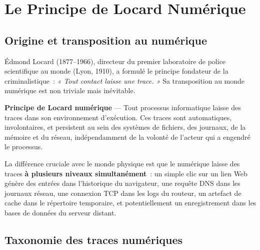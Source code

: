 \section{Le Principe de Locard Numérique}
\label{sec:locard}

\subsection{Origine et transposition au numérique}

Édmond Locard (1877--1966), directeur du premier laboratoire de police
scientifique au monde (Lyon, 1910), a formulé le principe fondateur de la
criminalistique~: \textit{« Tout contact laisse une trace. »} Sa transposition
au monde numérique est non triviale mais inévitable.

\begin{boxdef}
\textbf{Principe de Locard numérique} ---
Tout processus informatique laisse des traces dans son environnement
d'exécution. Ces traces sont automatiques, involontaires, et persistent au
sein des systèmes de fichiers, des journaux, de la mémoire et du réseau,
indépendamment de la volonté de l'acteur qui a engendré le processus.
\end{boxdef}

La différence cruciale avec le monde physique est que le numérique laisse
des traces \textbf{à plusieurs niveaux simultanément}~: un simple clic sur
un lien Web génère des entrées dans l'historique du navigateur, une requête
DNS dans les journaux réseau, une connexion TCP dans les logs du routeur,
un artefact de cache dans le répertoire temporaire, et potentiellement
un enregistrement dans les bases de données du serveur distant.

\subsection{Taxonomie des traces numériques}

